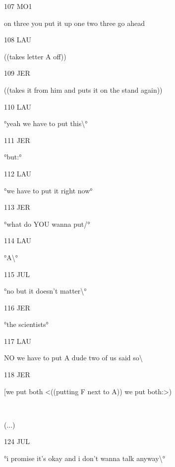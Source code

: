 \documentclass[output=paper]{langscibook}
\begin{document}
\parbox{14mm}{107 MO1} on three you put it up one two three go ahead\medskip

\parbox{14mm}{108 LAU}  ((takes letter A off))\medskip

\parbox{14mm}{109 JER}  ((takes it from him and puts it on the stand again))\medskip

\parbox{14mm}{110 LAU}  °yeah we have to put this{\textbackslash}°\medskip

\parbox{14mm}{111 JER}   °but:°\medskip

\parbox{14mm}{112 LAU}  °we have to put it right now°\medskip

\parbox{14mm}{113 JER}  °what do YOU wanna put/°\medskip

\parbox{14mm}{114 LAU}  °A{\textbackslash}°\medskip

\parbox{14mm}{115 JUL}  °no but it doesn’t matter{\textbackslash}°\medskip

\parbox{14mm}{116 JER}  °the scientists°\medskip

\parbox{14mm}{117 LAU}  NO we have to put A dude two of us said so{\textbackslash}\medskip 

\parbox{14mm}{118 JER}  [we put both <((putting F next to A)) we put both:>) \\
\parbox{14mm}{~}(...)\medskip 

\parbox{14mm}{124 JUL}  °i promise it’s okay and i don’t wanna talk anyway{\textbackslash}°

\z 
\end{document}
